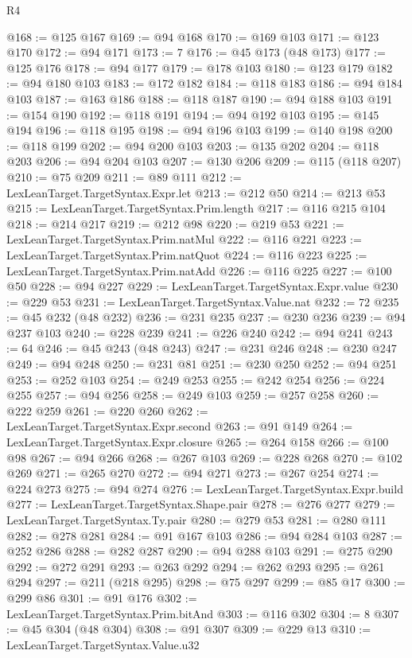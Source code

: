 \begin{lexlean}{R4}
\begin{coremodule}
@168 := @125 @167
@169 := @94 @168
@170 := @169 @103
@171 := @123 @170
@172 := @94 @171
@173 := 7
@176 := @45 @173 (@48 @173)
@177 := @125 @176
@178 := @94 @177
@179 := @178 @103
@180 := @123 @179
@182 := @94 @180 @103
@183 := @172 @182
@184 := @118 @183
@186 := @94 @184 @103
@187 := @163 @186
@188 := @118 @187
@190 := @94 @188 @103
@191 := @154 @190
@192 := @118 @191
@194 := @94 @192 @103
@195 := @145 @194
@196 := @118 @195
@198 := @94 @196 @103
@199 := @140 @198
@200 := @118 @199
@202 := @94 @200 @103
@203 := @135 @202
@204 := @118 @203
@206 := @94 @204 @103
@207 := @130 @206
@209 := @115 (@118 @207)
@210 := @75 @209
@211 := @89 @111
@212 := LexLeanTarget.TargetSyntax.Expr.let
@213 := @212 @50
@214 := @213 @53
@215 := LexLeanTarget.TargetSyntax.Prim.length
@217 := @116 @215 @104
@218 := @214 @217
@219 := @212 @98
@220 := @219 @53
@221 := LexLeanTarget.TargetSyntax.Prim.natMul
@222 := @116 @221
@223 := LexLeanTarget.TargetSyntax.Prim.natQuot
@224 := @116 @223
@225 := LexLeanTarget.TargetSyntax.Prim.natAdd
@226 := @116 @225
@227 := @100 @50
@228 := @94 @227
@229 := LexLeanTarget.TargetSyntax.Expr.value
@230 := @229 @53
@231 := LexLeanTarget.TargetSyntax.Value.nat
@232 := 72
@235 := @45 @232 (@48 @232)
@236 := @231 @235
@237 := @230 @236
@239 := @94 @237 @103
@240 := @228 @239
@241 := @226 @240
@242 := @94 @241
@243 := 64
@246 := @45 @243 (@48 @243)
@247 := @231 @246
@248 := @230 @247
@249 := @94 @248
@250 := @231 @81
@251 := @230 @250
@252 := @94 @251
@253 := @252 @103
@254 := @249 @253
@255 := @242 @254
@256 := @224 @255
@257 := @94 @256
@258 := @249 @103
@259 := @257 @258
@260 := @222 @259
@261 := @220 @260
@262 := LexLeanTarget.TargetSyntax.Expr.second
@263 := @91 @149
@264 := LexLeanTarget.TargetSyntax.Expr.closure
@265 := @264 @158
@266 := @100 @98
@267 := @94 @266
@268 := @267 @103
@269 := @228 @268
@270 := @102 @269
@271 := @265 @270
@272 := @94 @271
@273 := @267 @254
@274 := @224 @273
@275 := @94 @274
@276 := LexLeanTarget.TargetSyntax.Expr.build
@277 := LexLeanTarget.TargetSyntax.Shape.pair
@278 := @276 @277
@279 := LexLeanTarget.TargetSyntax.Ty.pair
@280 := @279 @53
@281 := @280 @111
@282 := @278 @281
@284 := @91 @167 @103
@286 := @94 @284 @103
@287 := @252 @286
@288 := @282 @287
@290 := @94 @288 @103
@291 := @275 @290
@292 := @272 @291
@293 := @263 @292
@294 := @262 @293
@295 := @261 @294
@297 := @211 (@218 @295)
@298 := @75 @297
@299 := @85 @17
@300 := @299 @86
@301 := @91 @176
@302 := LexLeanTarget.TargetSyntax.Prim.bitAnd
@303 := @116 @302
@304 := 8
@307 := @45 @304 (@48 @304)
@308 := @91 @307
@309 := @229 @13
@310 := LexLeanTarget.TargetSyntax.Value.u32

\end{coremodule}
\end{lexlean}
